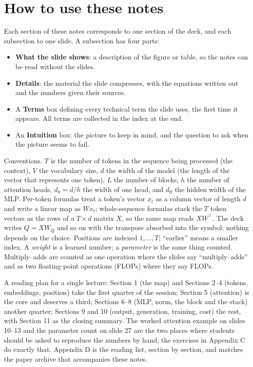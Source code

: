\documentclass[11pt,letterpaper]{article}
\newcommand{\dff}{d_{\mathrm{ff}}}
\newcommand{\dk}{d_k}
\begin{document}
\section*{How to use these notes}
Each section of these notes corresponds to one section of the deck, and each subsection to one slide. A subsection has four parts:
\begin{itemize}
  \item \textbf{What the slide shows}: a description of the figure or table, so the notes can be read without the slides.
  \item \textbf{Details}: the material the slide compresses, with the equations written out and the numbers given their sources.
  \item A \textbf{Terms} box defining every technical term the slide uses, the first time it appears. All terms are collected in the index at the end.
  \item An \textbf{Intuition} box: the picture to keep in mind, and the question to ask when the picture seems to fail.
\end{itemize}
Conventions. $T$ is the number of tokens in the sequence being processed (the context), $V$ the vocabulary size, $d$ the width of the model (the length of the vector that represents one token), $L$ the number of blocks, $h$ the number of attention heads, $\dk=d/h$ the width of one head, and $\dff$ the hidden width of the MLP. Per-token formulas treat a token's vector $x_t$ as a column vector of length $d$ and write a linear map as $W x_t$; whole-sequence formulas stack the $T$ token vectors as the rows of a $T\times d$ matrix $X$, so the same map reads $XW^{\top}$. The deck writes $Q=XW_Q$ and so on with the transpose absorbed into the symbol; nothing depends on the choice. Positions are indexed $1,\dots,T$; ``earlier'' means a smaller index. A \emph{weight} is a learned number; a \emph{parameter} is the same thing counted. Multiply--adds are counted as one operation where the slides say ``multiply--adds'' and as two floating-point operations (FLOPs) where they say FLOPs.

A reading plan for a single lecture: Section 1 (the map) and Sections 2--4 (tokens, embeddings, position) take the first quarter of the session; Section 5 (attention) is the core and deserves a third; Sections 6--8 (MLP, norm, the block and the stack) another quarter; Sections 9 and 10 (output, generation, training, cost) the rest, with Section 11 as the closing summary. The worked attention example on slides 10--13 and the parameter count on slide 27 are the two places where students should be asked to reproduce the numbers by hand; the exercises in Appendix C do exactly that. Appendix D is the reading list, section by section, and matches the paper archive that accompanies these notes.
\end{document}
